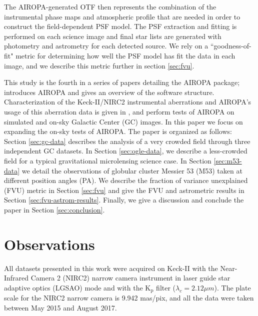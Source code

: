 \documentclass[]{spie}  %
\begin{document}
\indent The AIROPA-generated OTF then represents the combination of the instrumental phase maps and atmospheric profile that are needed in order to construct the field-dependent PSF model. The PSF extraction and fitting is performed on each science image and final star lists are generated with photometry and astrometry for each detected source. We rely on a ``goodness-of-fit" metric for determining how well the PSF model has fit the data in each image, and we describe this metric further in section \ref{sec:fvu}.

\indent This study is the fourth in a series of papers detailing the AIROPA package; \cite{witzel:2016a} introduces AIROPA and gives an overview of the software structure. Characterization of the Keck-II/NIRC2 instrumental aberrations and AIROPA's usage of this aberration data is given in \cite{Ciurlo:inprep}, and \cite{Turri:inprep} perform tests of AIROPA on simulated and on-sky Galactic Center (GC) images. In this paper we focus on expanding the on-sky tests of AIROPA. The paper is organized as follows: Section \ref{sec:gc-data} describes the analysis of a very crowded field through three independent GC datasets. In Section \ref{sec:ogle-data}, we describe a less-crowded field for a typical gravitational microlensing science case. In Section \ref{sec:m53-data} we detail the observations of globular cluster Messier 53 (M53) taken at different position angles (PA). We describe the fraction of variance unexplained (FVU) metric in Section \ref{sec:fvu} and give the FVU and astrometric results in Section \ref{sec:fvu-astrom-results}. Finally, we give a discussion and conclude the paper in Section \ref{sec:conclusion}.


\section{Observations} \label{sec:observations}
All datasets presented in this work were acquired on Keck-II with the Near-Infrared Camera 2 (NIRC2) narrow camera instrument in laser guide star adaptive optics (LGSAO) mode and with the K$_\textrm{p}$ filter ($\lambda_{c} = 2.12 \mu m$). The plate scale for the NIRC2 narrow camera is 9.942 mas/pix, and all the data were taken between May 2015 and August 2017.
\end{document}
